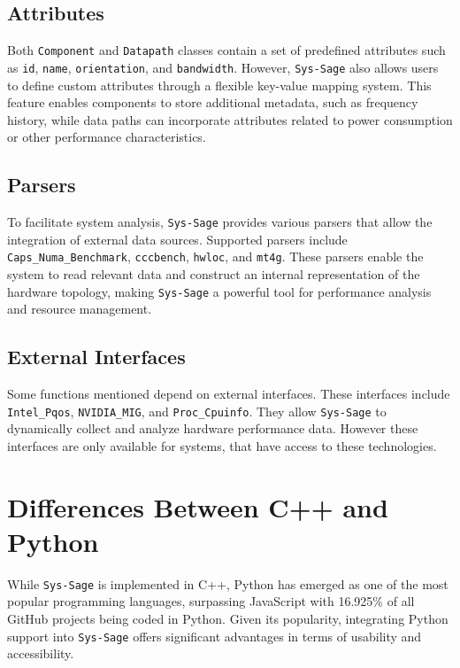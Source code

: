 \subsection{Attributes}

Both \texttt{Component} and \texttt{Datapath} classes contain a set of predefined attributes such as \texttt{id}, \texttt{name}, \texttt{orientation}, and \texttt{bandwidth}. However, \texttt{Sys-Sage} also allows users to define custom attributes through a flexible key-value mapping system. This feature enables components to store additional metadata, such as frequency history, while data paths can incorporate attributes related to power consumption or other performance characteristics.

\subsection{Parsers}

To facilitate system analysis, \texttt{Sys-Sage} provides various parsers that allow the integration of external data sources. Supported parsers include \texttt{Caps\_Numa\_Benchmark}, \texttt{cccbench}, \texttt{hwloc}, and \texttt{mt4g}. These parsers enable the system to read relevant data and construct an internal representation of the hardware topology, making \texttt{Sys-Sage} a powerful tool for performance analysis and resource management.

\subsection{External Interfaces}

Some functions mentioned depend on external interfaces. These interfaces include \texttt{Intel\_Pqos}, \texttt{NVIDIA\_MIG}, and \texttt{Proc\_Cpuinfo}. They allow \texttt{Sys-Sage} to dynamically collect and analyze hardware performance data. However these interfaces are only available for systems, that have access to these technologies.

\section{Differences Between C++ and Python}

While \texttt{Sys-Sage} is implemented in C++, Python has emerged as one of the most popular programming languages, surpassing JavaScript with 16.925\% of all GitHub projects being coded in Python. Given its popularity, integrating Python support into \texttt{Sys-Sage} offers significant advantages in terms of usability and accessibility.

